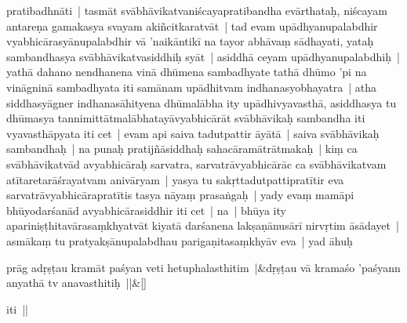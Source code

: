\documentclass[article,a4paper]{memoir}
\begin{document}
pratibadhnā\-ti | tasmā\-t svā\-bhā\-vikatvaniścayapratibandha evā\-rthataḥ, niścayam antareṇa gamakasya svayam akiñcitkaratvā\-t | tad evam upā\-dhyanupalabdhir vyabhicā\-rasyā\-nupalabdhir vā\- 'naikā\-ntikī\- na tayor abhā\-vaṃ sā\-dhayati, yataḥ sambandhasya svā\-bhā\-vikatvasiddhiḥ syā\-t | asiddhā\- ceyam upā\-dhyanupalabdhiḥ | yathā\- dahano nendhanena vinā\- dhū\-mena sambadhyate tathā\- dhū\-mo 'pi na vinā\-gninā\- sambadhyata iti samā\-nam upā\-dhitvam indhanasyobhayatra | \label{thakur75-110.26} atha siddhasyā\-gner indhanasā\-hityena dhū\-malā\-bha ity upā\-dhivyavasthā\-, asiddhasya tu dhū\-masya tannimittā\-tmalā\-bhatayā\-vyabhicā\-rā\-t svā\-bhā\-vikaḥ sambandha iti vyavasthā\-pyata iti cet | evam api saiva tadutpattir ā\-yā\-tā\- | saiva svā\-bhā\-vikaḥ sambandhaḥ | na punaḥ pratijñā\-siddhaḥ sahacā\-ramā\-trā\-tmakaḥ | kiṃ ca svā\-bhā\-vikatvā\-d avyabhicā\-raḥ sarvatra, sarvatrā\-vyabhicā\-rā\-c ca svā\-bhā\-vikatvam atī\-taretarā\-śrayatvam anivā\-ryam | yasya tu sakṛttadutpattipratī\-tir eva sarvatrā\-vyabhicā\-rapratī\-tis tasya nā\-yaṃ prasaṅgaḥ | \label{thakur75-110.32} yady evaṃ mamā\-pi bhū\-yodarśanā\-d avyabhicā\-rasiddhir iti cet | na | bhū\-ya ity apariniṣṭhitavā\-rasaṃkhyatvā\-t kiyatā\- darśanena lakṣaṇā\-nusā\-rī\- nirvṛtim ā\-sā\-dayet | asmā\-kaṃ tu pratyakṣā\-nupalabdhau parigaṇitasaṃkhyā\-v eva | yad ā\-huḥ
	\pend
      
	    
	    \stanza[\smallbreak]
prā\-g adṛṣṭau kramā\-t paśyan veti hetuphalasthitim |&dṛṣṭau vā\- kramaśo 'paśyann anyathā\- tv anavasthitiḥ ||\&[\smallbreak]


	

	  \pstart iti ||
	\pend
      
\end{document}
